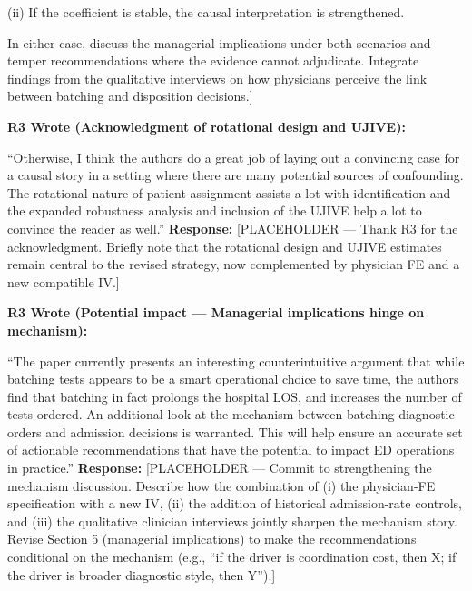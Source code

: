 \documentclass[11pt]{article}
\newenvironment{quote2}
{ \bigskip
\noindent
         \small\em
         \baselineskip=14pt
}
\newcommand{\1}{\hbox{\rm 1\kern-.35em 1}}
\begin{document}
(ii) If the coefficient is stable, the causal interpretation is strengthened.

In either case, discuss the managerial implications under both scenarios and temper recommendations where the evidence cannot adjudicate. Integrate findings from the qualitative interviews on how physicians perceive the link between batching and disposition decisions.]
\color{black}

\begin{quote2}
\textbf{R3 Wrote (Acknowledgment of rotational design and UJIVE):}

\noindent ``Otherwise, I think the authors do a great job of laying out a convincing case for a causal story in a setting where there are many potential sources of confounding. The rotational nature of patient assignment assists a lot with identification and the expanded robustness analysis and inclusion of the UJIVE help a lot to convince the reader as well.''
\end{quote2}

\noindent\textbf{Response:} \color{blue}[PLACEHOLDER --- Thank R3 for the acknowledgment. Briefly note that the rotational design and UJIVE estimates remain central to the revised strategy, now complemented by physician FE and a new compatible IV.]
\color{black}

\begin{quote2}
\textbf{R3 Wrote (Potential impact --- Managerial implications hinge on mechanism):}

\noindent ``The paper currently presents an interesting counterintuitive argument that while batching tests appears to be a smart operational choice to save time, the authors find that batching in fact prolongs the hospital LOS, and increases the number of tests ordered. An additional look at the mechanism between batching diagnostic orders and admission decisions is warranted. This will help ensure an accurate set of actionable recommendations that have the potential to impact ED operations in practice.''
\end{quote2}

\noindent\textbf{Response:} \color{blue}[PLACEHOLDER --- Commit to strengthening the mechanism discussion. Describe how the combination of (i) the physician-FE specification with a new IV, (ii) the addition of historical admission-rate controls, and (iii) the qualitative clinician interviews jointly sharpen the mechanism story. Revise Section 5 (managerial implications) to make the recommendations conditional on the mechanism (e.g., ``if the driver is coordination cost, then X; if the driver is broader diagnostic style, then Y'').]
\color{black}
\end{document}
